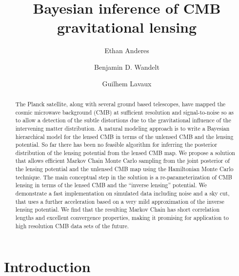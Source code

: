 \documentclass[iop,revtex4,apj,onecolumn]{emulateapj}
\begin{document}
\title{Bayesian inference of CMB gravitational lensing}

\author{Ethan Anderes}

\author{Benjamin D. Wandelt}
\author{Guilhem Lavaux}



\begin{abstract} 
The Planck satellite, along with several ground based telescopes, have mapped the  cosmic microwave background (CMB) at sufficient resolution and signal-to-noise so as to allow a detection of the subtle distortions  due to the gravitational influence of the intervening  matter distribution. A natural modeling approach is to write a Bayesian hierarchical model for the lensed CMB in terms of the unlensed CMB and the lensing potential. So far there has been no feasible algorithm for inferring the posterior distribution of the lensing potential from the lensed CMB map. We propose a solution that allows efficient Markov Chain Monte Carlo sampling from the joint posterior of the lensing potential and the unlensed CMB map using the Hamiltonian Monte Carlo technique. The main conceptual step in the solution is  a re-parameterization of CMB lensing in terms of the lensed CMB and the ``inverse lensing'' potential. We demonstrate a fast implementation on simulated data including noise and a sky cut, that uses a further acceleration based on a very mild approximation of the inverse lensing potential.  We find that the resulting Markov Chain has short correlation lengths and excellent convergence properties, making it promising for application to high resolution CMB data sets of the future.
\end{abstract}




\section{Introduction}
\end{document}
